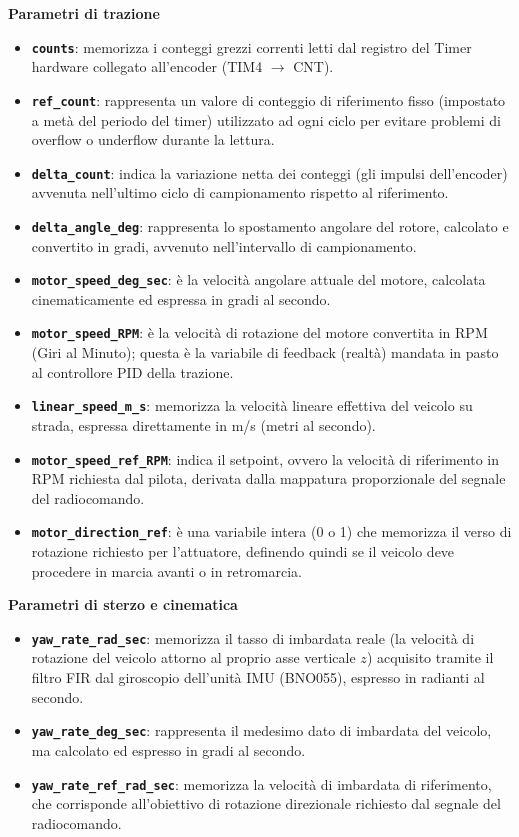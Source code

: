 \documentclass[11pt]{report}
\begin{document}
\noindent\textbf{Parametri di trazione}
\begin{itemize}
    \item \textbf{\texttt{counts}}: memorizza i conteggi grezzi correnti letti dal registro del Timer hardware collegato all'encoder (TIM4 $\rightarrow$ CNT). 
    \item \textbf{\texttt{ref\_count}}: rappresenta un valore di conteggio di riferimento fisso (impostato a metà del periodo del timer) utilizzato ad ogni ciclo per evitare problemi di overflow o underflow durante la lettura.
    \item \textbf{\texttt{delta\_count}}: indica la variazione netta dei conteggi (gli impulsi dell'encoder) avvenuta nell'ultimo ciclo di campionamento rispetto al riferimento.
    \item \textbf{\texttt{delta\_angle\_deg}}: rappresenta lo spostamento angolare del rotore, calcolato e convertito in gradi, avvenuto nell'intervallo di campionamento.
    \item \textbf{\texttt{motor\_speed\_deg\_sec}}: è la velocità angolare attuale del motore, calcolata cinematicamente ed espressa in gradi al secondo.
    \item \textbf{\texttt{motor\_speed\_RPM}}: è la velocità di rotazione del motore convertita in RPM (Giri al Minuto); questa è la variabile di feedback (realtà) mandata in pasto al controllore PID della trazione. 
    \item \textbf{\texttt{linear\_speed\_m\_s}}: memorizza la velocità lineare effettiva del veicolo su strada, espressa direttamente in m/s (metri al secondo). 
    \item \textbf{\texttt{motor\_speed\_ref\_RPM}}: indica il setpoint, ovvero la velocità di riferimento in RPM richiesta dal pilota, derivata dalla mappatura proporzionale del segnale del radiocomando. 
    \item \textbf{\texttt{motor\_direction\_ref}}: è una variabile intera (0 o 1) che memorizza il verso di rotazione richiesto per l'attuatore, definendo quindi se il veicolo deve procedere in marcia avanti o in retromarcia.
\end{itemize}

\vspace{0.4cm}

\noindent\textbf{Parametri di sterzo e cinematica}
\begin{itemize}
    \item \textbf{\texttt{yaw\_rate\_rad\_sec}}: memorizza il tasso di imbardata reale (la velocità di rotazione del veicolo attorno al proprio asse verticale $z$) acquisito tramite il filtro FIR dal giroscopio dell'unità IMU (BNO055), espresso in radianti al secondo. 
    \item \textbf{\texttt{yaw\_rate\_deg\_sec}}: rappresenta il medesimo dato di imbardata del veicolo, ma calcolato ed espresso in gradi al secondo.
    \item \textbf{\texttt{yaw\_rate\_ref\_rad\_sec}}: memorizza la velocità di imbardata di riferimento, che corrisponde all'obiettivo di rotazione direzionale richiesto dal segnale del radiocomando.
\end{itemize}
\end{document}
